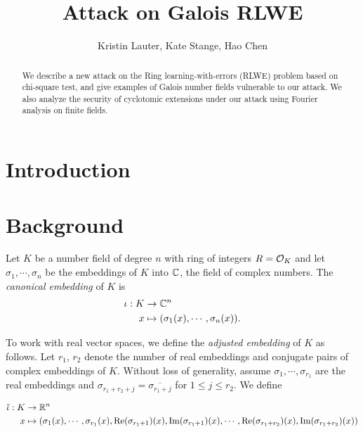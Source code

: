 \documentclass{amsart}
\title{Attack on Galois RLWE}
\author{Kristin Lauter, Kate Stange, Hao Chen}
\begin{document}
\maketitle

\begin{abstract}
We describe a new attack on the Ring learning-with-errors (RLWE) problem based on chi-square test, and give examples of Galois number fields vulnerable to our attack. We also analyze the security of cyclotomic extensions under our attack using Fourier analysis on finite fields.

\end{abstract}

\section{Introduction}



\section{Background}

Let $K$ be a number field of degree $n$ with ring of integers $R = \mathcal{O}_K$ and let $\sigma_1, \cdots, \sigma_n$ be the embeddings of $K$ into $\mathbb{C}$, the field of complex numbers. The {\it canonical embedding} of $K$ is
\begin{align*}
    \iota: K &\to \mathbb{C}^n \\
     x & \mapsto (\sigma_1(x), \cdots, \sigma_n(x)).
\end{align*}

To work with real vector spaces, we define the {\it adjusted embedding} of $K$ as follows. Let $r_1$, $r_2$ denote the number of real embeddings and conjugate pairs of complex embeddings of $K$. Without loss of generality, assume $\sigma_1, \cdots, \sigma_{r_1}$ are the real embeddings and $\sigma_{r_1+r_2+j} = \overline{\sigma_{r_1 + j}}$ for $1 \leq j \leq r_2$. We define

\begin{align*}
    \tilde{\iota}: K & \to \mathbb{R}^n \\
    x & \mapsto (\sigma_1(x), \cdots, \sigma_{r_1}(x), \Re(\sigma_{r_1+1})(x), \Im(\sigma_{r_1+1})(x), \cdots,  \Re(\sigma_{r_1+r_2})(x), \Im(\sigma_{r_1+r_2})(x))
\end{align*}
\end{document}
